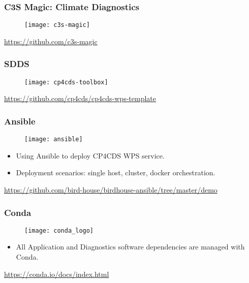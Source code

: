 \documentclass{beamer}
\begin{document}
\begin{frame}
\frametitle<presentation>{C3S Magic: Climate Diagnostics}

  \begin{figure}[ht]
    \centering
    \texttt{[image: c3s-magic]}
  \end{figure}

  \centering
  \footnotesize{\url{https://github.com/c3s-magic}}

\end{frame}

\begin{frame}
\frametitle<presentation>{SDDS}

  \begin{figure}[ht]
    \centering
    \texttt{[image: cp4cds-toolbox]}
  \end{figure}

  \centering
  \footnotesize{\url{https://github.com/cp4cds/cp4cds-wps-template}}

\end{frame}

\begin{frame}
\frametitle<presentation>{Ansible}

  \begin{figure}[ht]
    \centering
    \texttt{[image: ansible]}
  \end{figure}

  \begin{itemize}
    \item Using Ansible to deploy CP4CDS WPS service.
    \item Deployment scenarios: single host, cluster, docker orchestration.
  \end{itemize}

  \centering
  \footnotesize{\url{https://github.com/bird-house/birdhouse-ansible/tree/master/demo}}

\end{frame}

\begin{frame}
\frametitle<presentation>{Conda}

  \begin{figure}[ht]
    \centering
    \texttt{[image: conda\_logo]}
  \end{figure}

  \begin{itemize}
    \item All Application and Diagnostics software dependencies are managed with Conda.
  \end{itemize}

  \centering
  \footnotesize{\url{https://conda.io/docs/index.html}}

\end{frame}
\end{document}
